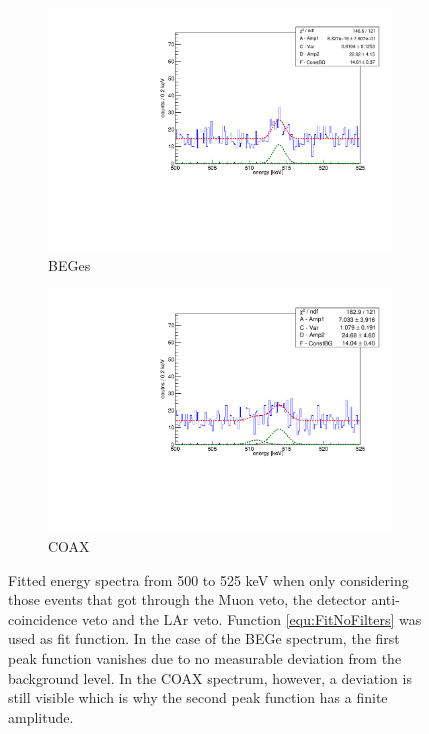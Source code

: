 \documentclass[encoding=utf8,british]{tumphthesis}
\begin{document}
\begin{figure}[t!]
	\centering
	\begin{subfigure}{.5\textwidth}
		\centering
		\includegraphics[width=\textwidth]{./Bilder/500525FitLArVetoBEGes.pdf}
		\caption{BEGes}
		\label{fig:FitLArVetoBEGes}
	\end{subfigure}\hfill%
	\begin{subfigure}{.5\textwidth}
		\centering
		\includegraphics[width=\textwidth]{./Bilder/500525FitLArVetoCOAX.pdf}
		\caption{COAX}
		\label{fig:FitLArVetoCOAX}
	\end{subfigure}
	\caption{
	Fitted energy spectra from 500 to 525 keV when only considering those events that got through the Muon veto, the detector anti-coincidence veto and the LAr veto. 
	Function \ref{equ:FitNoFilters} was used as fit function. 
    In the case of the BEGe spectrum, the first peak function vanishes due to no measurable deviation from the background level.
    In the COAX spectrum, however, a deviation is still visible which is why the second peak function has a finite amplitude.
	}
			\vspace{5mm}
\end{figure}
\end{document}
